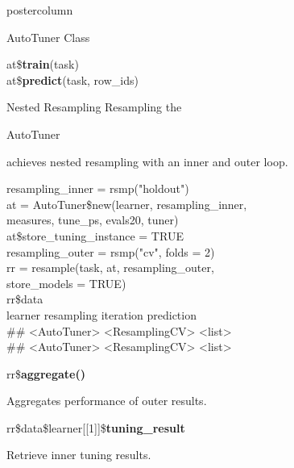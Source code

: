 \documentclass{beamer}
\newcommand{\codeinline}[1]{\begin{codeboxinline}#1\end{codeboxinline}}
\begin{document}
\begin{frame}[fragile]{}
\begin{columns}
\begin{column}{.245\textwidth}
\begin{beamercolorbox}[center]{postercolumn}
\begin{minipage}{.98\textwidth}
{\begin{myblock}{AutoTuner Class}
							\begin{codeboxmultiline}[width=16.5cm]
								at\$\textbf{train}(task)\\
								at\$\textbf{predict}(task, row\_ids)
							\end{codeboxmultiline}
						\end{myblock}
						\begin{myblock}{Nested Resampling}
							Resampling the \codeinline{AutoTuner} achieves nested resampling 
							with an inner and outer loop. 
							\\
							\begin{codeboxexample}
								{\footnotesize
									resampling\_inner = rsmp("holdout")
									\vspace{1em}
									\\
									at = AutoTuner\$new(learner, resampling\_inner, \\
									\hspace*{1ex}measures, tune\_ps, evals20, tuner) \\
									at\$store\_tuning\_instance = TRUE
									\vspace{1em}
									\\
									resampling\_outer = rsmp("cv", folds = 2)\\
									rr = resample(task, at, resampling\_outer, \\
									\hspace*{1ex}store\_models = TRUE)
									\vspace{1em}
									\\
									rr\$data
									\vspace{1em}
									\\
									\phantom{n} \space\space\space\space\space learner
									\space\space\space\space resampling iteration prediction\\
									\#\# <AutoTuner> <ResamplingCV>
									\space\space\space\space\space\space\space\space 1
									\space\space\space\space <list>\\
									\#\# <AutoTuner> <ResamplingCV>
									\space\space\space\space\space\space\space\space 2
									\space\space\space\space <list>}
							\end{codeboxexample}
							\vspace{1em}
							\begin{codebox}
								rr\$\textbf{aggregate()}
							\end{codebox}
							Aggregates performance of outer results.
							\\
							\begin{codebox}
								rr\$data\$learner[[1]]\$\textbf{tuning\_result}
							\end{codebox}
							Retrieve inner tuning results.
						\end{myblock}
						\vfill}
				\end{minipage}
			\end{beamercolorbox}
		\end{column}
	\end{columns}
\end{frame}
\end{document}
